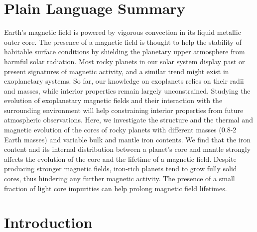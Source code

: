 \documentclass[draft]{agujournal2019} %
\newcommand{\irene}[1]{\textcolor{orange}{\textit{(Irene: #1)}}}
\begin{document}
\section*{Plain Language Summary}
Earth's magnetic field is powered by vigorous convection in its liquid metallic outer core. The presence of a magnetic field is thought to help the stability of habitable surface conditions by shielding the planetary upper atmosphere from harmful solar radiation. Most rocky planets in our solar system display past or present signatures of magnetic activity, and a similar trend might exist in exoplanetary systems. So far, our knowledge on exoplanets relies on their radii and masses, while interior properties remain largely unconstrained. Studying the evolution of exoplanetary magnetic fields and their interaction with the surrounding environment will help constraining interior properties from future atmospheric observations.
Here, we investigate the structure and the thermal and magnetic evolution of the cores of rocky planets with different masses (0.8-2 Earth masses) and variable bulk and mantle iron contents. We find that the iron content and its internal distribution between a planet's core and mantle strongly affects the evolution of the core and the lifetime of a magnetic field. Despite producing stronger magnetic fields, iron-rich planets tend to grow fully solid cores, thus hindering any further magnetic activity. The presence of a small fraction of light core impurities can help prolong magnetic field lifetimes.


%
%

\section{Introduction}
\end{document}

